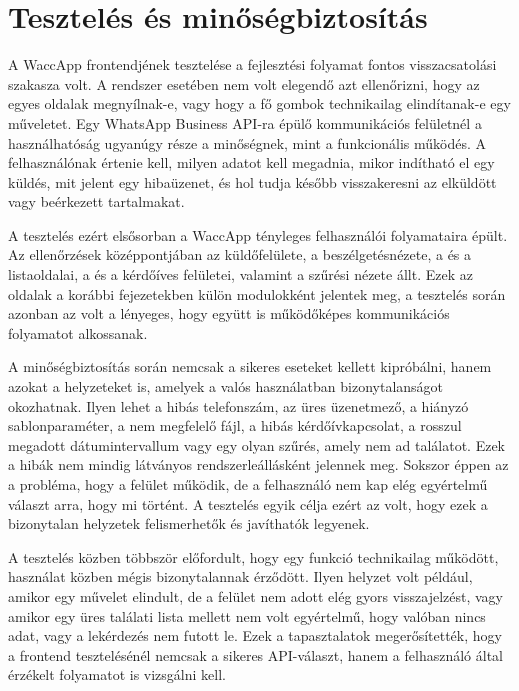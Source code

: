 \chapter{Tesztelés és minőségbiztosítás}

A WaccApp frontendjének tesztelése a fejlesztési folyamat fontos visszacsatolási szakasza volt. A rendszer esetében nem volt elegendő azt ellenőrizni, hogy az egyes oldalak megnyílnak-e, vagy hogy a fő gombok technikailag elindítanak-e egy műveletet. Egy WhatsApp Business API-ra épülő kommunikációs felületnél a használhatóság ugyanúgy része a minőségnek, mint a funkcionális működés. A felhasználónak értenie kell, milyen adatot kell megadnia, mikor indítható el egy küldés, mit jelent egy hibaüzenet, és hol tudja később visszakeresni az elküldött vagy beérkezett tartalmakat.

A tesztelés ezért elsősorban a WaccApp tényleges felhasználói folyamataira épült. Az ellenőrzések középpontjában az  küldőfelülete, a  beszélgetésnézete, a  és a  listaoldalai, a  és a  kérdőíves felületei, valamint a  szűrési nézete állt. Ezek az oldalak a korábbi fejezetekben külön modulokként jelentek meg, a tesztelés során azonban az volt a lényeges, hogy együtt is működőképes kommunikációs folyamatot alkossanak.

A minőségbiztosítás során nemcsak a sikeres eseteket kellett kipróbálni, hanem azokat a helyzeteket is, amelyek a valós használatban bizonytalanságot okozhatnak. Ilyen lehet a hibás telefonszám, az üres üzenetmező, a hiányzó sablonparaméter, a nem megfelelő fájl, a hibás kérdőívkapcsolat, a rosszul megadott dátumintervallum vagy egy olyan szűrés, amely nem ad találatot. Ezek a hibák nem mindig látványos rendszerleállásként jelennek meg. Sokszor éppen az a probléma, hogy a felület működik, de a felhasználó nem kap elég egyértelmű választ arra, hogy mi történt. A tesztelés egyik célja ezért az volt, hogy ezek a bizonytalan helyzetek felismerhetők és javíthatók legyenek.

A tesztelés közben többször előfordult, hogy egy funkció technikailag működött, használat közben mégis bizonytalannak érződött. Ilyen helyzet volt például, amikor egy művelet elindult, de a felület nem adott elég gyors visszajelzést, vagy amikor egy üres találati lista mellett nem volt egyértelmű, hogy valóban nincs adat, vagy a lekérdezés nem futott le. Ezek a tapasztalatok megerősítették, hogy a frontend tesztelésénél nemcsak a sikeres API-választ, hanem a felhasználó által érzékelt folyamatot is vizsgálni kell.


